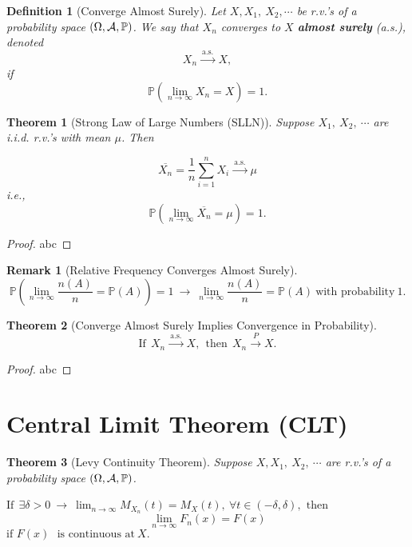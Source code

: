 \documentclass[openany,12pt]{book}
\newtheorem{theorem}{Theorem}[chapter]
\newtheorem{remark}{Remark}[chapter]
\newtheorem{definition}{Definition}[chapter]
\begin{document}
\begin{definition}[Converge Almost Surely]
Let $X,X_{1},\ X_{2},\cdots$ be r.v.'s of a probability space $(\Omega,\mathcal{A},\mathbb{P})$. We say that $X_{n}$ converges to $X$ \textbf{almost surely} (a.s.),
denoted
\[X_{n}\xrightarrow{\ \text{a.s.}\ }X,\]
if \[\mathbb{P}\left( \lim_{n \to \infty}X_{n} = X \right) = 1.\]
\end{definition}

\begin{theorem}[Strong Law of Large Numbers (SLLN)]
Suppose $X_{1},\ X_{2},\ \cdots$ are i.i.d. r.v.'s with mean $\mu$. Then

\[\overline{X_{n}} = \frac{1}{n}\sum_{i = 1}^{n}X_{i}\xrightarrow{\ \text{a.s.}\ }\mu\]
i.e.,
\[\mathbb{P}\left( \lim_{n \to \infty}\overline{X_{n}} = \mu \right) = 1.\]
\end{theorem}

\begin{proof}
  abc
\end{proof}

\begin{remark}[Relative Frequency Converges Almost Surely]
\[\mathbb{P}\left( \lim_{n \to \infty}\frac{n( A )}{n} = \mathbb{P}(A) \right) = 1\  \to \ \lim_{n \to \infty}\frac{n( A )}{n} = \mathbb{P}( A )\ \mathrm{\text{with\ probability}}\ 1.\]
\end{remark}

\begin{theorem}[Converge Almost Surely Implies Convergence in Probability]
\[\mathrm{\text{If}}\mathrm{\ }\ X_{n}\xrightarrow{\ \text{a.s.}\ }X,\mathrm{\ }\mathrm{\ }\mathrm{\text{then}}\mathrm{\ }\ X_{n}\xrightarrow{\ P\ }X.\]
\end{theorem}

\begin{proof}
  abc
\end{proof}

\section{Central Limit Theorem (CLT)}

\begin{theorem}[Levy Continuity Theorem]
Suppose $X,X_{1},\ X_{2},\ \cdots$ are r.v.'s of a probability space $(\Omega,\mathcal{A},\mathbb{P})$. 

$\mathrm{\text{If}}\ \ \exists\delta > 0\  \to \ \lim_{n \to \infty}{M_{X_{n}}(t)} = M_{X}(t),\ \forall t \in \left( - \delta,\delta \right),$ $ \mathrm{\text{then}}$\[ \lim_{n \to \infty}F_{n}(x) = F(x)\]
$\mathrm{\text{if }}F(x)\text{\ }\mathrm{\text{is\ continuous\ at}}\ X.$
\end{theorem}
\end{document}
